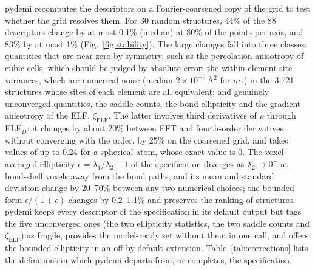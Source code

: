 \documentclass[11pt,a4paper]{article}
\begin{document}
pydemi recomputes the descriptors on a Fourier-coarsened copy of the grid to
test whether the grid resolves them. For 30 random structures, 44\% of the 88
descriptors change by at most 0.1\% (median) at 80\% of the points per axis,
and 83\% by at most 1\% (Fig.~\ref{fig:stability}). The large changes fall into
three classes: quantities that are near zero by symmetry, such as the
percolation anisotropy of cubic cells, which should be judged by absolute
error; the within-element site variances, which are numerical noise (median
$2\times10^{-9}$\,\AA$^2$ for $m_1$) in the 3,721 structures whose sites of each
element are all equivalent; and genuinely unconverged quantities, the saddle
counts, the bond ellipticity and the gradient anisotropy of the ELF,
$\zeta_{\mathrm{ELF}}$. The latter involves third derivatives of $\rho$
through ELF$_D$: it changes by about 20\% between FFT and fourth-order
derivatives without converging with the order, by 25\% on the coarsened grid,
and takes values of up to 0.24 for a spherical atom, whose exact value is 0.
The voxel-averaged ellipticity
$\epsilon=\lambda_1/\lambda_2-1$ of the specification diverges as
$\lambda_2\to0^-$ at bond-shell voxels away from the bond paths, and its mean
and standard deviation change by 20--70\% between any two numerical choices;
the bounded form $\epsilon/(1+\epsilon)$ changes by 0.2--1.1\% and preserves the
ranking of structures. pydemi keeps every descriptor of the specification in
its default output but tags the five unconverged ones (the two ellipticity
statistics, the two saddle counts and $\zeta_{\mathrm{ELF}}$) as fragile, provides the model-ready set
without them in one call, and offers the bounded ellipticity in an
off-by-default extension. Table~\ref{tab:corrections} lists the definitions in
which pydemi departs from, or completes, the specification.
\end{document}
